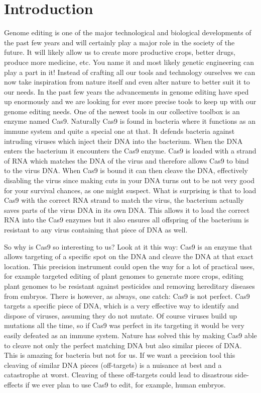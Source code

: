 \chapter{Introduction}

Genome editing is one of the major technological and biological developments of the past few years and will certainly play a major role in the society of the future. It will likely allow us to create more productive crops, better drugs, produce more medicine, etc. You name it and most likely genetic engineering can play a part in it! Instead of crafting all our tools and technology ourselves we can now take inspiration from nature itself and even alter nature to better suit it to our needs. In the past few years the advancements in genome editing have sped up enormously and we are looking for ever more precise tools to keep up with our genome editing needs. One of the newest tools in our collective toolbox is an enzyme named Cas9. Naturally Cas9 is found in bacteria where it functions as an immune system and quite a special one at that. It defends bacteria against intruding viruses which inject their DNA into the bacterium. When the DNA enters the bacterium it encounters the Cas9 enzyme. Cas9 is loaded with a strand of RNA which matches the DNA of the virus and therefore allows Cas9 to bind to the virus DNA. When Cas9 is bound it can then cleave the DNA, effectively disabling the virus since making cuts in your DNA turns out to be not very good for your survival chances, as one might suspect. What is surprising is that to load Cas9 with the correct RNA strand to match the virus, the bacterium actually saves parts of the virus DNA in its own DNA. This allows it to load the correct RNA into the Cas9 enzymes but it also ensures all offspring of the bacterium is resistant to any virus containing that piece of DNA as well.

So why is Cas9 so interesting to us? Look at it this way: Cas9 is an enzyme that allows targeting of a specific spot on the DNA and cleave the DNA at that exact location. This precision instrument could open the way for a lot of practical uses, for example targeted editing of plant genomes to generate more crops, editing plant genomes to be resistant against pesticides and removing hereditary diseases from embryos. There is however, as always, one catch: Cas9 is not perfect. Cas9 targets a specific piece of DNA, which is a very effective way to identify and dispose of viruses, assuming they do not mutate. Of course viruses build up mutations all the time, so if Cas9 was perfect in its targeting it would be very easily defeated as an immune system. Nature has solved this by making Cas9 able to cleave not only the perfect matching DNA but also similar pieces of DNA. This is amazing for bacteria but not for us. If we want a precision tool this cleaving of similar DNA pieces (off-targets) is a nuisance at best and a catastrophe at worst. Cleaving of these off-targets could lead to disastrous side-effects if we ever plan to use Cas9 to edit, for example, human embryos.

